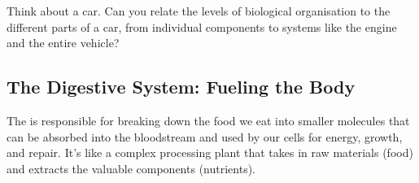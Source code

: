 \begin{stopandthink}
Think about a car. Can you relate the levels of biological organisation to the different parts of a car, from individual components to systems like the engine and the entire vehicle?
\end{stopandthink}


\subsection{The Digestive System: Fueling the Body}

The  is responsible for breaking down the food we eat into smaller molecules that can be absorbed into the bloodstream and used by our cells for energy, growth, and repair.  It's like a complex processing plant that takes in raw materials (food) and extracts the valuable components (nutrients).

